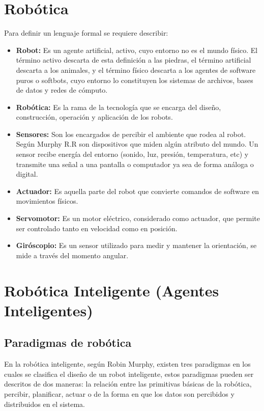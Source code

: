 \section{Robótica} \label{sect:robotica}
 
Para definir un lenguaje formal se requiere describir:
\begin{itemize}
\item{\textbf{Robot:} Es un agente artificial, activo, cuyo entorno no es el mundo físico. El término activo descarta de esta definición a las piedras, el término artificial descarta a los animales, y el término físico descarta a los agentes de software puros o softbots, cuyo entorno lo constituyen los sistemas de archivos, bases de datos y redes de cómputo. \cite{peterNorvig}}

\item{\textbf{Robótica:} Es la rama de la tecnología que se encarga del diseño, construcción, operación y aplicación de los robots. \cite{oxfordRobotics}}

\item{\textbf{Sensores:}  Son los encargados de percibir el ambiente que rodea al robot. Según Murphy R.R son dispositivos que miden algún atributo del mundo. Un sensor recibe energía del entorno (sonido, luz, presión, temperatura, etc) y transmite una señal a una pantalla o computador ya sea de forma análoga o digital. \cite{AiRobotics}}

\item{\textbf{Actuador:}  Es aquella parte del robot que convierte comandos de software en movimientos físicos.  \cite{peterNorvig}}

\item{\textbf{Servomotor:}  Es un motor eléctrico, considerado como actuador, que permite ser controlado tanto en velocidad como en posición. }

\item{\textbf{Giróscopio:} Es un sensor utilizado para medir y mantener la orientación, se mide a través del momento angular. \cite{gyro1}}
\end{itemize}

\section{Robótica Inteligente (Agentes Inteligentes)} \label{sect:AgentesInteligentes}
\subsection{Paradigmas de robótica}
En la robótica inteligente, según Robin Murphy, existen tres paradigmas en los cuales se clasifica el diseño de un robot inteligente, estos paradigmas pueden ser descritos de dos maneras: la relación entre las primitivas básicas de la robótica, percibir, planificar, actuar o de la forma en que los datos son percibidos y distribuidos en el sistema.

